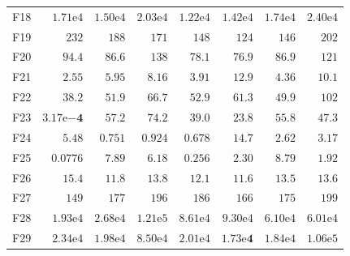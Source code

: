 \begin{tabular}{lrrrrrrr}
F18 & $1.71\mathrm{e}{4}$ & $1.50\mathrm{e}{4}$ & $2.03\mathrm{e}{4}$ & $1.22\mathrm{e}{4}$ & $1.42\mathrm{e}{4}$ & $1.74\mathrm{e}{4}$ & $2.40\mathrm{e}{4}$ \\
F19 & $232$ & $188$ & $171$ & $148$ & $124$ & $146$ & $202$ \\
F20 & $94.4$ & $86.6$ & $138$ & $78.1$ & $\mathbf{76.9}$ & $86.9$ & $121$ \\
F21 & $2.55$ & $5.95$ & $8.16$ & $3.91$ & $12.9$ & $4.36$ & $10.1$ \\
F22 & $38.2$ & $51.9$ & $66.7$ & $52.9$ & $61.3$ & $49.9$ & $102$ \\
F23 & $\mathbf{3.17\mathrm{e}{-4}}$ & $57.2$ & $74.2$ & $39.0$ & $23.8$ & $55.8$ & $47.3$ \\
F24 & $5.48$ & $0.751$ & $0.924$ & $0.678$ & $14.7$ & $2.62$ & $3.17$ \\
F25 & $\mathbf{0.0776}$ & $7.89$ & $6.18$ & $0.256$ & $2.30$ & $8.79$ & $1.92$ \\
F26 & $15.4$ & $11.8$ & $13.8$ & $12.1$ & $11.6$ & $13.5$ & $13.6$ \\
F27 & $149$ & $177$ & $196$ & $186$ & $166$ & $175$ & $199$ \\
F28 & $1.93\mathrm{e}{4}$ & $2.68\mathrm{e}{4}$ & $1.21\mathrm{e}{5}$ & $8.61\mathrm{e}{4}$ & $9.30\mathrm{e}{4}$ & $6.10\mathrm{e}{4}$ & $6.01\mathrm{e}{4}$ \\
F29 & $2.34\mathrm{e}{4}$ & $1.98\mathrm{e}{4}$ & $8.50\mathrm{e}{4}$ & $2.01\mathrm{e}{4}$ & $\mathbf{1.73\mathrm{e}{4}}$ & $1.84\mathrm{e}{4}$ & $1.06\mathrm{e}{5}$ \\
\bottomrule
\end{tabular}
